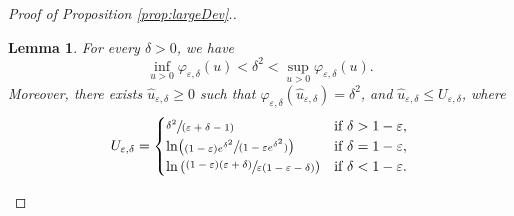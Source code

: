 \documentclass[JEP,XML,SOM,Unicode, NoEqCountersInSection,NoFloatCountersInSection,published]{cedram}
\newcommand{\spfrac}[2]{\sfrac{#1}{(#2)}}
\newtheorem{lemma}{Lemma}
\theoremstyle{definition}
\begin{document}
\begin{proof}[Proof of Proposition \ref{prop:largeDev}.]
\begin{lemma}\label{lem:estim1214}
For every $\delta>0$, we have
\[
\inf_{u >0}\varphi_{\varepsilon,\delta}(u)< \delta^2< \sup_{u >0}\varphi_{\varepsilon,\delta}(u).
\]
Moreover, there exists $\hat u_{\varepsilon,\delta}\geq 0$ such that $\varphi_{\varepsilon,\delta}(\hat u_{\varepsilon,\delta})=\delta^2$, and $\hat u_{\varepsilon,\delta}\leq U_{\varepsilon,\delta}$, where
\[
U_{\varepsilon,\delta}=\begin{cases}
\spfrac{\delta^2}{\varepsilon+\delta-1} & \text{if }\delta>1-\varepsilon,\\
\ln\bigl(\spfrac{(1-\varepsilon)e^{\delta^2}}{1-\varepsilon e^{\delta^2}} \bigr)& \text{if }\delta=1-\varepsilon,\\
\ln\left(\sfrac{(1-\varepsilon)(\varepsilon+\delta)}{\varepsilon(1-\varepsilon -\delta)}\right) & \text{if }\delta<1-\varepsilon.
\end{cases}
\]
\end{lemma}


\end{proof}
\end{document}

